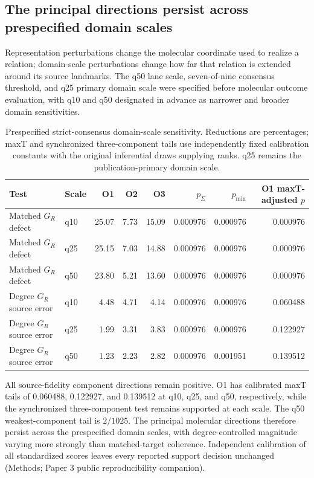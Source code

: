 \documentclass[11pt]{article}
\begin{document}
\subsection{The principal directions persist across prespecified domain scales}

Representation perturbations change the molecular coordinate used to realize a relation; domain-scale perturbations change how far that relation is extended around its source landmarks. The q50 lane scale, seven-of-nine consensus threshold, and q25 primary domain scale were specified before molecular outcome evaluation, with q10 and q50 designated in advance as narrower and broader domain sensitivities.

\begin{table}[H]
\centering
\footnotesize
\setlength{\tabcolsep}{4pt}
\caption{Prespecified strict-consensus domain-scale sensitivity. Reductions are percentages; maxT and synchronized three-component tails use independently fixed calibration constants with the original inferential draws supplying ranks. q25 remains the publication-primary domain scale.}
\label{tab:scales}
\begin{tabular}{@{}llrrrrrr@{}}
\toprule
Test & Scale & O1 & O2 & O3 & \(p_\Sigma\) & \(p_{\min}\) & O1 maxT-adjusted \(p\)\\
\midrule
Matched \(G_R\) defect & q10 & 25.07 & 7.73 & 15.09 & 0.000976 & 0.000976 & 0.000976\\
Matched \(G_R\) defect & q25 & 25.15 & 7.03 & 14.88 & 0.000976 & 0.000976 & 0.000976\\
Matched \(G_R\) defect & q50 & 23.80 & 5.21 & 13.60 & 0.000976 & 0.000976 & 0.000976\\
Degree \(G_R\) source error & q10 & 4.48 & 4.71 & 4.14 & 0.000976 & 0.000976 & 0.060488\\
Degree \(G_R\) source error & q25 & 1.99 & 3.31 & 3.83 & 0.000976 & 0.000976 & 0.122927\\
Degree \(G_R\) source error & q50 & 1.23 & 2.23 & 2.82 & 0.000976 & 0.001951 & 0.139512\\
\bottomrule
\end{tabular}
\end{table}

All source-fidelity component directions remain positive. O1 has calibrated maxT tails of 0.060488, 0.122927, and 0.139512 at q10, q25, and q50, respectively, while the synchronized three-component test remains supported at each scale. The q50 weakest-component tail is \(2/1025\). The principal molecular directions therefore persist across the prespecified domain scales, with degree-controlled magnitude varying more strongly than matched-target coherence. Independent calibration of all standardized scores leaves every reported support decision unchanged (Methods; Paper 3 public reproducibility companion).
\end{document}
